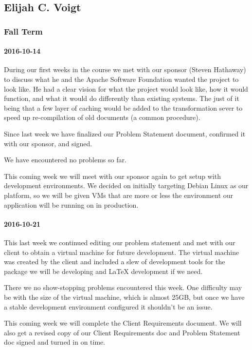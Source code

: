 \subsection{Elijah C.  Voigt}

\subsubsection{Fall Term}

\paragraph{2016-10-14}

During our first weeks in the course we met with our sponsor (Steven Hathaway) to discuss what he and the Apache Software Foundation wanted the project to look like.
He had a clear vision for what the project would look like, how it would function, and what it would do differently than existing systems.
The just of it being that a few layer of caching would be added to the transformation sever to speed up re-compilation of old documents (a common procedure).

Since last week we have finalized our Problem Statement document, confirmed it with our sponsor, and signed.

We have encountered no problems so far.

This coming week we will meet with our sponsor again to get setup with development environments.
We decided on initially targeting Debian Linux as our platform, so we will be given VMs that are more or less the environment our application will be running on in production.

\paragraph{2016-10-21}

This last week we continued editing our problem statement and met with our client to obtain a virtual machine for future development.
The virtual machine was created by the client and included a slew of development tools for the package we will be developing and LaTeX development if we need.

There we no show-stopping problems encountered this week.
One difficulty may be with the size of the virtual machine, which is almost 25GB, but once we have a stable development environment configured it shouldn't be an issue.

This coming week we will complete the Client Requirements document.
We will also get a revised copy of our Client Requirements doc and Problem Statement doc signed and turned in on time.


